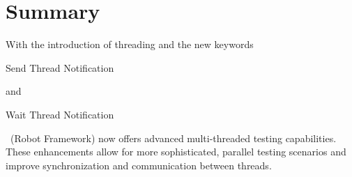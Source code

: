 \section{Summary}

With the introduction of threading and the new keywords 
\begin{robotcode}
Send Thread Notification
\end{robotcode}
and 
\begin{robotcode}
Wait Thread Notification
\end{robotcode}
\rfw\ (Robot Framework) now offers advanced multi-threaded testing capabilities. These enhancements allow for more sophisticated, parallel testing scenarios and improve synchronization and communication between threads.
